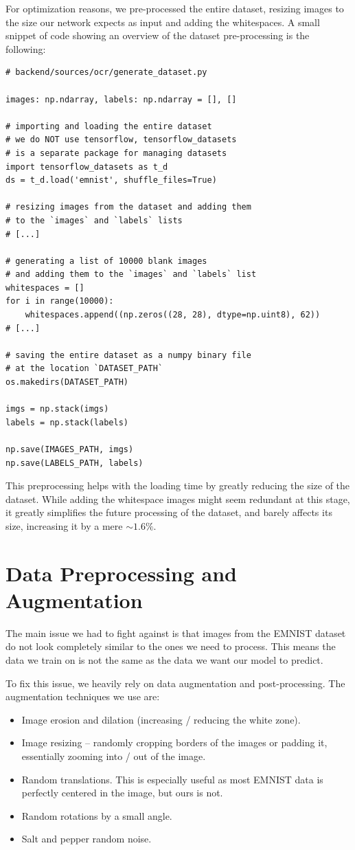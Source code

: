 \documentclass[11pt, a4paper]{report}
\begin{document}
For optimization reasons, we pre-processed the entire dataset, resizing images to the size our network expects as input and adding the whitespaces. A small snippet of code showing an overview of the dataset pre-processing is the following:


\begin{verbatim}
# backend/sources/ocr/generate_dataset.py

images: np.ndarray, labels: np.ndarray = [], []

# importing and loading the entire dataset
# we do NOT use tensorflow, tensorflow_datasets
# is a separate package for managing datasets
import tensorflow_datasets as t_d
ds = t_d.load('emnist', shuffle_files=True)

# resizing images from the dataset and adding them
# to the `images` and `labels` lists
# [...]

# generating a list of 10000 blank images
# and adding them to the `images` and `labels` list
whitespaces = []
for i in range(10000):
    whitespaces.append((np.zeros((28, 28), dtype=np.uint8), 62))
# [...]

# saving the entire dataset as a numpy binary file
# at the location `DATASET_PATH`
os.makedirs(DATASET_PATH)

imgs = np.stack(imgs)
labels = np.stack(labels)

np.save(IMAGES_PATH, imgs)
np.save(LABELS_PATH, labels)
\end{verbatim}

This preprocessing helps with the loading time by greatly reducing the size of the dataset. While adding the whitespace images might seem redundant at this stage, it greatly simplifies the future processing of the dataset, and barely affects its size, increasing it by a mere $\sim1.6\%$.

\section{Data Preprocessing and Augmentation}

The main issue we had to fight against is that images from the EMNIST dataset do not look completely similar to the ones we need to process. This means the data we train on is not the same as the data we want our model to predict.

To fix this issue, we heavily rely on data augmentation and post-processing. The augmentation techniques we use are:
\begin{itemize}
	\item Image erosion and dilation (increasing / reducing the white zone).
	\item Image resizing -- randomly cropping borders of the images or padding it, essentially zooming into / out of the image.
	\item Random translations. This is especially useful as most EMNIST data is perfectly centered in the image, but ours is not.
	\item Random rotations by a small angle.
	\item Salt and pepper random noise.
\end{itemize}
\end{document}

